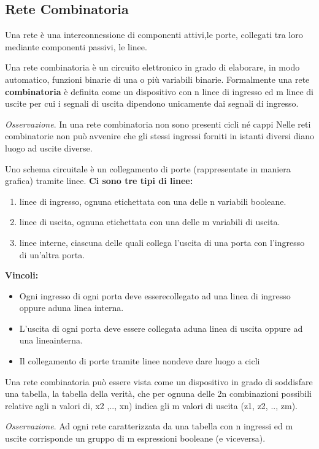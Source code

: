 \documentclass[12pt]{article} %
\begin{document}
\subsection{Rete Combinatoria}
Una rete è una interconnessione di componenti attivi,le porte, collegati tra loro mediante componenti passivi, le linee. \par\medskip\noindent
Una rete combinatoria è un circuito elettronico in grado di elaborare, in modo automatico, funzioni binarie di una o più variabili binarie.
Formalmente una rete \textbf{combinatoria} è definita come un dispositivo con n linee di ingresso ed m linee di uscite per cui i segnali di uscita dipendono unicamente dai segnali di ingresso.\par\medskip\noindent
\textit{Osservazione}. In una rete combinatoria non sono presenti cicli né cappi Nelle reti combinatorie non può avvenire che gli stessi ingressi forniti in istanti diversi diano luogo ad uscite diverse. \par\medskip\noindent
Uno schema circuitale è un collegamento di porte (rappresentate in maniera grafica) tramite linee. \textbf{Ci sono tre tipi di linee:}
\begin{enumerate}
    \item linee di ingresso, ognuna etichettata con una delle n variabili booleane.
    \item linee di uscita, ognuna etichettata con una delle m variabili di uscita.
    \item linee interne, ciascuna delle quali collega l'uscita di una porta con l'ingresso di un'altra porta.
\end{enumerate}
\textbf{Vincoli:}
\begin{itemize}
    \item Ogni ingresso di ogni porta deve esserecollegato ad una linea di ingresso oppure aduna linea interna.
    \item  L'uscita di ogni porta deve essere collegata aduna linea di uscita oppure ad una lineainterna.
    \item Il collegamento di porte tramite linee nondeve dare luogo a cicli
\end{itemize}
\par\medskip\noindent
Una rete combinatoria può essere vista come un dispositivo in grado di soddisfare una tabella, la tabella della verità, che per ognuna delle 2n combinazioni possibili relative agli n valori di, x2
,.., xn) indica gli m valori di uscita (z1, z2, .., zm).\par\medskip\noindent
\textit{Osservazione}. Ad ogni rete caratterizzata da una tabella con n ingressi ed m uscite corrisponde un gruppo di m espressioni booleane (e viceversa).
\newpage
\end{document}
